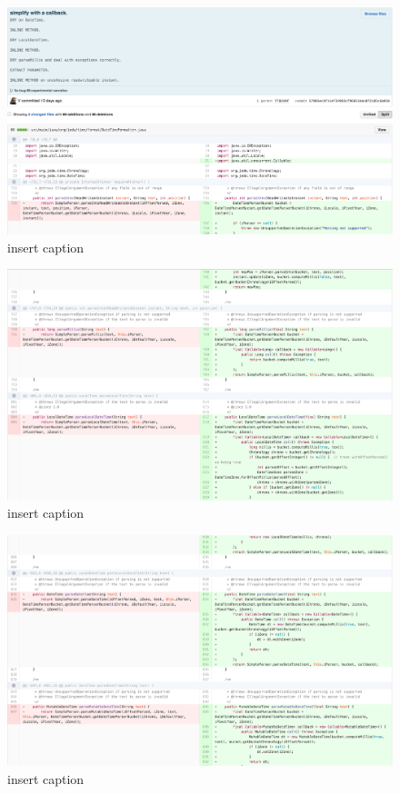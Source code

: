 \begin{figure}[H]
	\centering
	\includegraphics[width=\linewidth]{code88}
	\caption{insert caption}
\end{figure}
\begin{figure}[H]
	\centering
	\includegraphics[width=\linewidth]{code89}
	\caption{insert caption}
\end{figure}
\begin{figure}[H]
	\centering
	\includegraphics[width=\linewidth]{code90}
	\caption{insert caption}
\end{figure}
